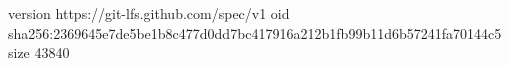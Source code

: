 version https://git-lfs.github.com/spec/v1
oid sha256:2369645e7de5be1b8c477d0dd7bc417916a212b1fb99b11d6b57241fa70144c5
size 43840
